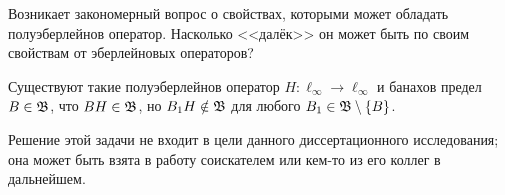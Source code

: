 Возникает закономерный вопрос о свойствах,
которыми может обладать полуэберлейнов оператор.
Насколько <<далёк>> он может быть по своим свойствам от эберлейновых операторов?

\begin{hypothesis}
	Существуют такие полуэберлейнов оператор $H:\ell_\infty\to\ell_\infty$ и банахов предел $B\in \mathfrak{B}$,
	что $BH \in \mathfrak{B}$, но $B_1 H \notin \mathfrak{B}$ для любого $B_1\in \mathfrak{B}\setminus\{B\}$.
\end{hypothesis}

Решение этой задачи не входит в цели данного диссертационного исследования;
она может быть взята в работу соискателем или кем-то из его коллег в дальнейшем.
